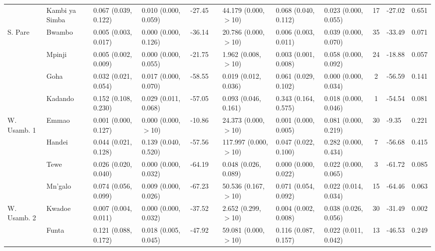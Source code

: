\begin{tabular}{lllllllllclr}
            & Kambi ya Simba & 0.067 (0.039, 0.122)   & 0.010 (0.000, 0.059)   & -27.45   & &   44.179 (0.000, $>$10)  & 0.068 (0.040, 0.112)   & 0.023 (0.000, 0.055)   & 17  & -27.02   & 0.651\\
\cmidrule{2-12}
S. Pare     & Bwambo         & 0.005 (0.003, 0.017)   & 0.000 (0.000, 0.126)   & -36.14   & &   20.786 (0.000, $>$10)  & 0.006 (0.003, 0.011)   & 0.039 (0.000, 0.070)   & 35  & -33.49   & 0.071\\
            & Mpinji         & 0.005 (0.002, 0.009)   & 0.000 (0.000, 0.055)   & -21.75   & &   1.962 (0.008, $>$10)   & 0.003 (0.001, 0.008)   & 0.058 (0.000, 0.092)   & 24  & -18.88   & 0.057\\
            & Goha           & 0.032 (0.021, 0.054)   & 0.017 (0.000, 0.070)   & -58.55   & &   0.019 (0.012, 0.036)   & 0.061 (0.029, 0.102)   & 0.000 (0.000, 0.034)   & 2   & -56.59   & 0.141\\
            & Kadando        & 0.152 (0.108, 0.230)   & 0.029 (0.011, 0.068)   & -57.05   & &   0.093 (0.046, 0.161)   & 0.343 (0.164, 0.575)   & 0.018 (0.000, 0.046)   & 1   & -54.54   & 0.081\\
\cmidrule{2-12}
W. Usamb. 1 & Emmao          & 0.001 (0.000, 0.127)   & 0.000 (0.000, $>$10)   & -10.86   & &   24.373 (0.000, $>$10)  & 0.001 (0.000, 0.005)   & 0.081 (0.000, 0.219)   & 30  & -9.35    & 0.221\\
            & Handei         & 0.044 (0.021, 0.128)   & 0.139 (0.040, 0.520)   & -57.56   & &   117.997 (0.000, $>$10) & 0.047 (0.022, 0.100)   & 0.282 (0.000, 0.434)   & 7   & -56.68   & 0.415\\
            & Tewe           & 0.026 (0.020, 0.040)   & 0.000 (0.000, 0.032)   & -64.19   & &   0.048 (0.026, 0.089)   & 0.000 (0.000, 0.022)   & 0.022 (0.000, 0.065)   & 3   & -61.72   & 0.085\\
            & Mn'galo        & 0.074 (0.056, 0.099)   & 0.009 (0.000, 0.026)   & -67.23   & &   50.536 (0.167, $>$10)  & 0.071 (0.054, 0.092)   & 0.022 (0.014, 0.034)   & 15  & -64.46   & 0.063\\
\cmidrule{2-12}
W. Usamb. 2 & Kwadoe         & 0.007 (0.004, 0.011)   & 0.000 (0.000, 0.032)   & -37.52   & &   2.652 (0.299, $>$10)   & 0.004 (0.002, 0.008)   & 0.038 (0.026, 0.056)   & 30  & -31.49   & 0.002\\
            & Funta          & 0.121 (0.088, 0.172)   & 0.018 (0.005, 0.045)   & -47.92   & &   59.081 (0.000, $>$10)  & 0.116 (0.087, 0.157)   & 0.022 (0.011, 0.042)   & 13  & -46.53   & 0.249\\

\end{tabular}
